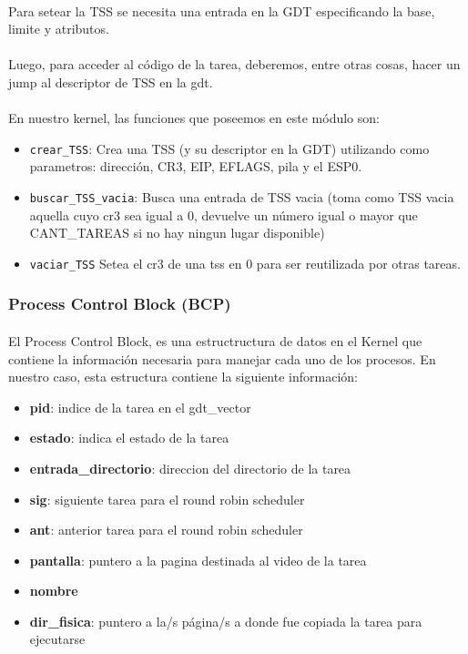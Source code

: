 \documentclass[11pt, a4paper]{article}
\begin{document}
	\paragraph{}
	Para setear la TSS se necesita una entrada en la GDT especificando la base, limite y atributos.

	\paragraph{}
	Luego, para acceder al c\'odigo de la tarea, deberemos, entre otras cosas, hacer un jump al descriptor de TSS en la gdt.

	\paragraph{}
	En nuestro kernel, las funciones que poseemos en este módulo son:
	\begin{itemize}
		\item \texttt{crear\_TSS}: Crea una TSS (y su descriptor en la GDT) utilizando como parametros: dirección, CR3, EIP, EFLAGS, pila y el ESP0.
		\item \texttt{buscar\_TSS\_vacia}: Busca una entrada de TSS vacia (toma como TSS vacia aquella cuyo cr3 sea igual a 0, devuelve un número igual o mayor que CANT\_TAREAS si no hay ningun lugar disponible)
		\item \texttt{vaciar\_TSS} Setea el cr3 de una tss en 0 para ser reutilizada por otras tareas.
	\end{itemize}

\subsubsection{Process Control Block (BCP) }
\label{bcp}
	\paragraph{}
	El Process Control Block, es una estructructura de datos en el Kernel que contiene la información necesaria para manejar cada uno de los procesos.
	En nuestro caso, esta estructura contiene la siguiente información:
	\begin{itemize}
		\item \textbf{pid}: indice de la tarea en el gdt\_vector
		\item \textbf{estado}: indica el estado de la tarea
		\item \textbf{entrada\_directorio}: direccion del directorio de la tarea
		\item \textbf{sig}: siguiente tarea para el round robin scheduler
		\item \textbf{ant}: anterior tarea para el round robin scheduler
		\item \textbf{pantalla}: puntero a la pagina destinada al video de la tarea
		\item \textbf{nombre}
		\item \textbf{dir\_fisica}: puntero a la/s página/s a donde fue copiada la tarea para ejecutarse
	\end{itemize}
\end{document}
